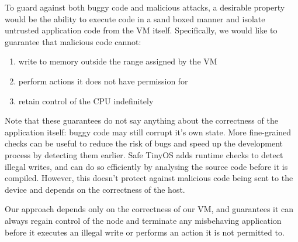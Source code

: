 To guard against both buggy code and malicious attacks, a desirable property would be the ability to execute code in a sand boxed manner and isolate untrusted application code from the VM itself. Specifically, we would like to guarantee that malicious code cannot:
\begin{enumerate}
	\item write to memory outside the range assigned by the VM
	\item perform actions it does not have permission for
	\item retain control of the CPU indefinitely
\end{enumerate}

Note that these guarantees do not say anything about the correctness of the application itself: buggy code may still corrupt it's own state. More fine-grained checks can be useful to reduce the risk of bugs and speed up the development process by detecting them earlier. Safe TinyOS \cite{Cooprider:2007ub} adds runtime checks to detect illegal writes, and can do so efficiently by analysing the source code before it is compiled. However, this doesn't protect against malicious code being sent to the device and depends on the correctness of the host.

Our approach depends only on the correctness of our VM, and guarantees it can always regain control of the node and terminate any misbehaving application before it executes an illegal write or performs an action it is not permitted to.


